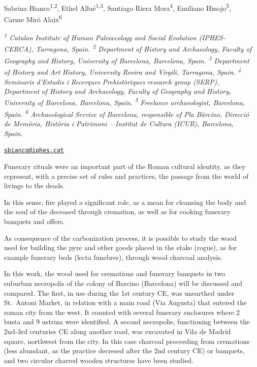 \documentclass[
]{book}
\begin{document}
Sabrina Bianco\textsuperscript{1,2}, Ethel Allué\textsuperscript{1,3}, Santiago Riera Mora\textsuperscript{4}, Emiliano Hinojo\textsuperscript{5}, Carme Miró Alaix\textsuperscript{6}

\emph{\textsuperscript{1} Catalan Institute of Human Paleoecology and Social Evolution (IPHES-CERCA), Tarragona, Spain. \textsuperscript{2} Department of History and Archaeology, Faculty of Geography and History, University of Barcelona, Barcelona, Spain. \textsuperscript{3} Department of History and Art History, University Rovira and Virgili, Tarragona, Spain. \textsuperscript{4} Seminaris d'Estudis i Recerques Prehistòriques research group (SERP), Department of History and Archaeology, Faculty of Geography and History, University of Barcelona, Barcelona, Spain. \textsuperscript{5} Freelance archaeologist, Barcelona, Spain. \textsuperscript{6} Archaeological Service of Barcelona, responsible of Pla Bàrcino, Direcció de Memòria, Història i Patrimoni -- Institut de Cultura (ICUB), Barcelona, Spain.}

\href{mailto:sbianco@iphes.cat}{\nolinkurl{sbianco@iphes.cat}}

Funerary rituals were an important part of the Roman cultural identity, as they represent, with a precise set of rules and practices, the passage from the world of livings to the deads.

In this sense, fire played a significant role, as a mean for cleansing the body and the soul of the deceased through cremation, as well as for cooking funerary banquets and offers.

As consequence of the carbonization process, it is possible to study the wood used for building the pyre and other goods placed in the stake (rogus), as for example funerary beds (lecta funebres), through wood charcoal analysis.

In this work, the wood used for cremations and funerary banquets in two suburban necropolis of the colony of Barcino (Barcelona) will be discussed and compared. The first, in use during the 1st century CE, was unearthed under St.~Antoni Market, in relation with a main road (Via Augusta) that entered the roman city from the west. It counted with several funerary enclosures where 2 busta and 9 ustrina were identified. A second necropolis, functioning between the 2nd-3rd centuries CE along another road, was excavated in Vila de Madrid square, northwest from the city. In this case charcoal proceeding from cremations (less abundant, as the practice decresed after the 2nd century CE) or banquets, and two circular charred wooden structures have been studied.
\end{document}
